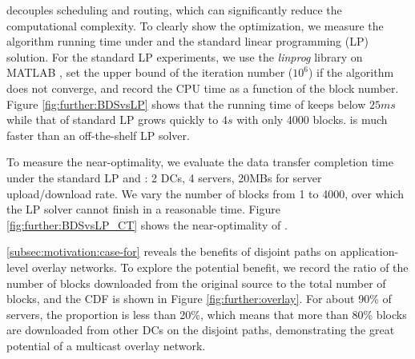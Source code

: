 \label{subsubsec:evaluation:depth}

 \name decouples scheduling and routing, which can significantly reduce the computational complexity. To clearly show the optimization, we measure the algorithm running time under \name and the standard linear programming (LP) solution. For the standard LP experiments, we use the \textit{linprog} library on MATLAB \cite{mathworks}, set the upper bound of the iteration number ($10^6$) if the algorithm does not converge, and record the CPU time as a function of the block number. Figure \ref{fig:further:BDSvsLP} shows that the running time of \name keeps below $25ms$ while that of standard LP grows quickly to $4s$ with only 4000 blocks. %
\name is much faster than an off-the-shelf LP solver.

 To measure the near-optimality, we evaluate the data transfer completion time under the standard LP and \name: 2 DCs, 4 servers, 20MBs for server upload/download rate.
We vary the number of blocks from 1 to 4000, over which the LP solver cannot finish in a reasonable time. Figure \ref{fig:further:BDSvsLP_CT} shows the near-optimality of \name.%


 \Section\ref{subsec:motivation:case-for} reveals the benefits of disjoint paths on application-level overlay networks. To explore the potential benefit, we record the ratio of the number of blocks downloaded from the original source to the total number of blocks, and the CDF is shown in Figure \ref{fig:further:overlay}. For about 90\% of servers, the proportion is less than 20\%, which means that more than 80\% blocks are downloaded from other DCs on the disjoint paths, demonstrating the great potential of a multicast overlay network.




